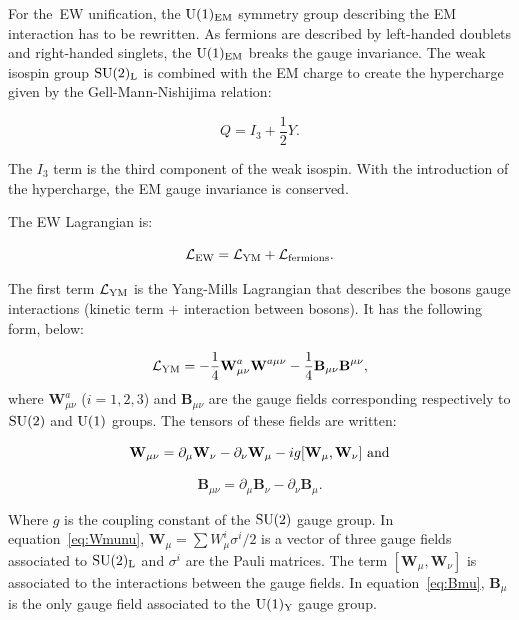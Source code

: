     For the~\gls{EW} unification, the $\rm{U}(1)_{\rm{EM}}$ symmetry group describing  the \gls{EM} interaction has to be rewritten.
    As fermions are described by left-handed doublets and right-handed singlets, the $\rm{U}(1)_{\rm{EM}}$ breaks the gauge invariance.
    The weak isospin group $\rm{SU}(2)_{\rm{L}}$ is combined with the EM charge to create the hypercharge given by the Gell-Mann-Nishijima relation: 
  
    \begin{equation}
      Q = I_3 + \frac{1}{2}Y.
    \end{equation}
   
    The $I_3$ term is the third component of the weak isospin.
    With the introduction of the hypercharge, the EM gauge invariance is conserved.

    The \gls{EW} Lagrangian is:

    \begin{equation}
      \mathcal{L}_{\rm{EW}} = \mathcal{L}_{\rm{YM}} + \mathcal{L}_{\rm{fermions}}.
      \label{eq:ewLag}
    \end{equation}

    The first term $\mathcal{L}_{\rm{YM}}$ is the Yang-Mills Lagrangian that describes the bosons gauge interactions (kinetic term + interaction between bosons). 
    It has the following form, below:

    \begin{equation}
      \mathcal{L}_{\rm{YM}} = - \frac{1}{4}\textbf{W}^a_{\mu\nu} \textbf{W}^{a\mu\nu} - \frac{1}{4}\textbf{B}_{\mu\nu}\textbf{B}^{\mu\nu},
    \end{equation}
    where $\textbf{W}^{a}_{\mu\nu}$ ($i=1,2,3$) and $\textbf{B}_{\mu\nu}$ are the gauge fields corresponding respectively to $\rm{SU}(2)$ and $\rm{U}(1)$ groups.
    The tensors of these fields are written:

    \begin{equation}
        \textbf{W}_{\mu\nu}  =  \partial_{\mu}\textbf{W}_{\nu} - \partial_{\nu}\textbf{W}_{\mu} - i g [\textbf{W}_{\mu},\textbf{W}_{\nu}]~\rm{and}
      \label{eq:Wmunu}
    \end{equation}

    \begin{equation}
        \textbf{B}_{\mu\nu}  =  \partial_{\mu}\textbf{B}_{\nu} - \partial_{\nu}\textbf{B}_{\mu}.
        \label{eq:Bmu}
    \end{equation}
   
    Where $g$ is the coupling constant of the $\rm{SU}(2)$ gauge group. 
    In equation~\ref{eq:Wmunu}, $\textbf{W}_{\mu} = \sum W^i_{\mu}\sigma^i/2$ is a vector of three gauge fields associated to $\rm{SU}(2)_{\rm{L}}$ and $\sigma^i$ are the Pauli matrices. 
    The term $[\textbf{W}_{\mu},\textbf{W}_{\nu}]$ is associated to the interactions between the gauge fields.
    In equation~\ref{eq:Bmu}, $\textbf{B}_{\mu}$ is the only gauge field associated to the $\rm{U}(1)_{\rm{Y}}$ gauge group.

